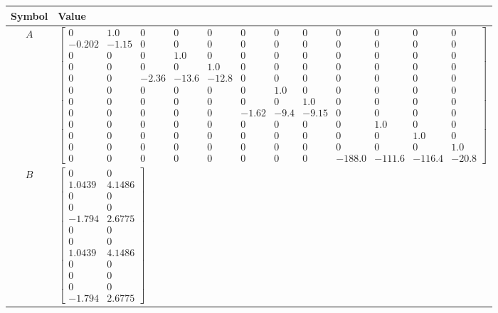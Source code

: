 \begin{tabular}{cl}
\hline
  Symbol  & Value                                                                                                                                                                                                                                                                                                                                                                                                                                                                                                                                                                                                                                                                                                      \\
\hline
   $A$    & $\left[\begin{array}{cccccccccccc}0 & 1.0 & 0 & 0 & 0 & 0 & 0 & 0 & 0 & 0 & 0 & 0\\-0.202 & -1.15 & 0 & 0 & 0 & 0 & 0 & 0 & 0 & 0 & 0 & 0\\0 & 0 & 0 & 1.0 & 0 & 0 & 0 & 0 & 0 & 0 & 0 & 0\\0 & 0 & 0 & 0 & 1.0 & 0 & 0 & 0 & 0 & 0 & 0 & 0\\0 & 0 & -2.36 & -13.6 & -12.8 & 0 & 0 & 0 & 0 & 0 & 0 & 0\\0 & 0 & 0 & 0 & 0 & 0 & 1.0 & 0 & 0 & 0 & 0 & 0\\0 & 0 & 0 & 0 & 0 & 0 & 0 & 1.0 & 0 & 0 & 0 & 0\\0 & 0 & 0 & 0 & 0 & -1.62 & -9.4 & -9.15 & 0 & 0 & 0 & 0\\0 & 0 & 0 & 0 & 0 & 0 & 0 & 0 & 0 & 1.0 & 0 & 0\\0 & 0 & 0 & 0 & 0 & 0 & 0 & 0 & 0 & 0 & 1.0 & 0\\0 & 0 & 0 & 0 & 0 & 0 & 0 & 0 & 0 & 0 & 0 & 1.0\\0 & 0 & 0 & 0 & 0 & 0 & 0 & 0 & -188.0 & -111.6 & -116.4 & -20.8\end{array}\right]$ \\
   $B$    & $\left[\begin{matrix}0 & 0\\1.0439 & 4.1486\\0 & 0\\0 & 0\\-1.794 & 2.6775\\0 & 0\\0 & 0\\1.0439 & 4.1486\\0 & 0\\0 & 0\\0 & 0\\-1.794 & 2.6775\end{matrix}\right]$                                                                                                                                                                                                                                                                                                                                                                                                                                                                                                                                        \\

\end{tabular}
